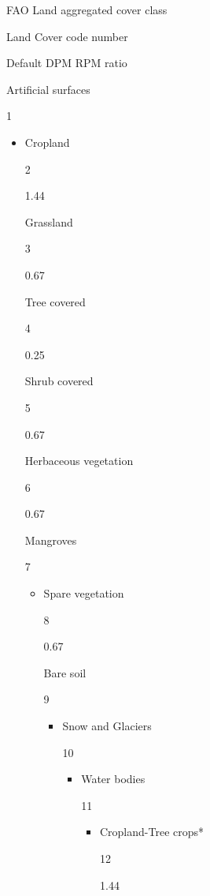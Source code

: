 \documentclass[
  10pt,
  b5paper,
]{book}
\begin{document}
FAO Land aggregated cover class

Land Cover code number

Default DPM RPM ratio

Artificial surfaces

1

\begin{itemize}
\item
  Cropland

  2

  1.44

  Grassland

  3

  0.67

  Tree covered

  4

  0.25

  Shrub covered

  5

  0.67

  Herbaceous vegetation

  6

  0.67

  Mangroves

  7

  \begin{itemize}
  \item
    Spare vegetation

    8

    0.67

    Bare soil

    9

    \begin{itemize}
    \item
      Snow and Glaciers

      10

      \begin{itemize}
      \item
        Water bodies

        11

        \begin{itemize}
        \item
          Cropland-Tree crops*

          12

          1.44
        \end{itemize}
      \end{itemize}
    \end{itemize}
  \end{itemize}
\end{itemize}
\end{document}
